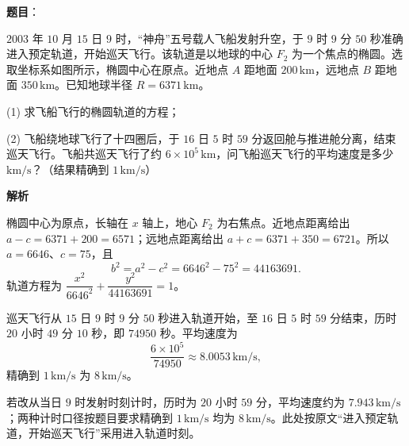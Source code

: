 \begin{answer}

\textbf{题目}：

$2003$ 年 $10$ 月 $15$ 日 $9$ 时，“神舟”五号载人飞船发射升空，于 $9$ 时 $9$ 分 $50$ 秒准确进入预定轨道，开始巡天飞行。该轨道是以地球的中心 $F_2$ 为一个焦点的椭圆。选取坐标系如图所示，椭圆中心在原点。近地点 $A$ 距地面 $200\,\text{km}$，远地点 $B$ 距地面 $350\,\text{km}$。已知地球半径 $R=6371\,\text{km}$。

(1) 求飞船飞行的椭圆轨道的方程；

(2) 飞船绕地球飞行了十四圈后，于 $16$ 日 $5$ 时 $59$ 分返回舱与推进舱分离，结束巡天飞行。飞船共巡天飞行了约 $6\times10^5\,\text{km}$，问飞船巡天飞行的平均速度是多少 $\text{km/s}$？（结果精确到 $1\,\text{km/s}$）
\nopagebreak[4]
\begin{center}\end{center}
\nopagebreak[4]
\textbf{解析}


椭圆中心为原点，长轴在 $x$ 轴上，地心 $F_2$ 为右焦点。近地点距离给出 $a-c=6371+200=6571$；远地点距离给出 $a+c=6371+350=6721$。所以 $a=6646$、$c=75$，且
\nopagebreak[4]
\[
b^2=a^2-c^2=6646^2-75^2=44163691.
\]
轨道方程为 $\dfrac{x^2}{6646^2}+\dfrac{y^2}{44163691}=1$。


巡天飞行从 $15$ 日 $9$ 时 $9$ 分 $50$ 秒进入轨道开始，至 $16$ 日 $5$ 时 $59$ 分结束，历时 $20$ 小时 $49$ 分 $10$ 秒，即 $74950$ 秒。平均速度为
\nopagebreak[4]
\[
\frac{6\times10^5}{74950}\approx8.0053\,\text{km/s},
\]
精确到 $1\,\text{km/s}$ 为 $8\,\text{km/s}$。

若改从当日 $9$ 时发射时刻计时，历时为 $20$ 小时 $59$ 分，平均速度约为 $7.943\,\text{km/s}$；两种计时口径按题目要求精确到 $1\,\text{km/s}$ 均为 $8\,\text{km/s}$。此处按原文“进入预定轨道，开始巡天飞行”采用进入轨道时刻。



\end{answer}
